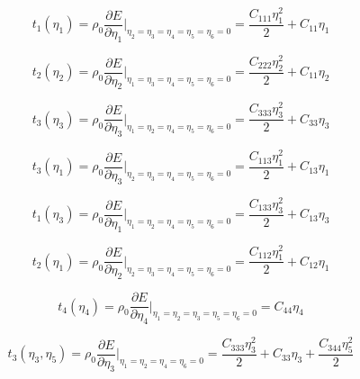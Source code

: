 \documentclass[showpacs,aps,floatfix,prb,reprint,superscriptaddress]{revtex4-1}
\begin{document}
\begin{equation}
\label{eqn:s1} 
t_{1} \left(\eta_{1}\right) = \rho_{0} \frac{\partial E}{\partial \eta_{1}}\Bigr|_{\eta_2=\eta_3=\eta_4=\eta_5=\eta_6=0} = \frac{C_{111}\eta_{1}^2}{2} + C_{11}\eta_{1}
\end{equation}

\begin{equation}
\label{eqn:s2} 
t_{2} \left(\eta_{2}\right) = \rho_{0} \frac{\partial E}{\partial \eta_{2}}\Bigr|_{\eta_1=\eta_3=\eta_4=\eta_5=\eta_6=0} = \frac{C_{222}\eta_{2}^2}{2} + C_{11}\eta_{2}
\end{equation}


\begin{equation}
\label{eqn:s3} 
t_{3} \left(\eta_{3}\right) = \rho_{0} \frac{\partial E}{\partial \eta_{3}}\Bigr|_{\eta_1=\eta_2=\eta_4=\eta_5=\eta_6=0} = \frac{C_{333}\eta_{3}^2}{2} + C_{33}\eta_{3}
\end{equation}


\begin{equation}
\label{eqn:s4} 
t_{3} \left(\eta_{1}\right) = \rho_{0} \frac{\partial E}{\partial \eta_{3}}\Bigr|_{\eta_2=\eta_3=\eta_4=\eta_5=\eta_6=0} = \frac{C_{113}\eta_{1}^2}{2} + C_{13}\eta_{1}
\end{equation}


\begin{equation}
\label{eqn:s5} 
t_{1} \left(\eta_{3}\right) = \rho_{0} \frac{\partial E}{\partial \eta_{1}}\Bigr|_{\eta_1=\eta_2=\eta_4=\eta_5=\eta_6=0} = \frac{C_{133}\eta_{3}^2}{2} + C_{13}\eta_{3}
\end{equation}

\begin{equation}
\label{eqn:s6} 
t_{2} \left(\eta_{1}\right) = \rho_{0} \frac{\partial E}{\partial \eta_{2}}\Bigr|_{\eta_2=\eta_3=\eta_4=\eta_5=\eta_6=0} = \frac{C_{112}\eta_{1}^2}{2} + C_{12}\eta_{1}
\end{equation}

\begin{equation}
\label{eqn:s7} 
t_{4} \left(\eta_{4}\right) = \rho_{0} \frac{\partial E}{\partial \eta_{4}}\Bigr|_{\eta_1=\eta_2=\eta_3=\eta_5=\eta_6=0} = C_{44}\eta_{4}
\end{equation}

\begin{equation}
\label{eqn:s8} 
t_{3} \left(\eta_{3}, \eta_{5}\right) = \rho_{0} \frac{\partial E}{\partial \eta_{3}}\Bigr|_{\eta_1=\eta_2=\eta_4=\eta_6=0} = \frac{C_{333}\eta_{3}^2}{2} + C_{33}\eta_{3} + \frac{C_{344}\eta_{5}^2}{2}
\end{equation}
\end{document}
